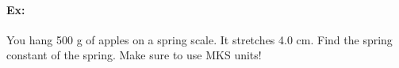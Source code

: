 \documentclass[12pt]{article}
\begin{document}
\pagestyle{empty}

\paragraph{Ex:} You hang 500 g of apples on a spring scale.  It stretches 4.0 cm.  Find the spring constant of the spring.  Make sure to use MKS units!
\end{document}

